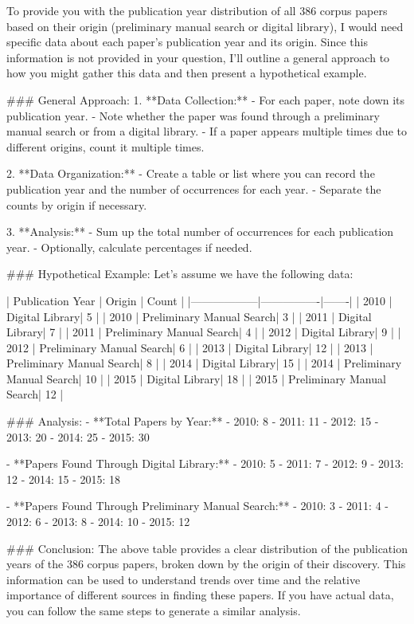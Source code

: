 To provide you with the publication year distribution of all 386 corpus papers based on their origin (preliminary manual search or digital library), I would need specific data about each paper's publication year and its origin. Since this information is not provided in your question, I'll outline a general approach to how you might gather this data and then present a hypothetical example.

### General Approach:
1. **Data Collection:**
   - For each paper, note down its publication year.
   - Note whether the paper was found through a preliminary manual search or from a digital library.
   - If a paper appears multiple times due to different origins, count it multiple times.

2. **Data Organization:**
   - Create a table or list where you can record the publication year and the number of occurrences for each year.
   - Separate the counts by origin if necessary.

3. **Analysis:**
   - Sum up the total number of occurrences for each publication year.
   - Optionally, calculate percentages if needed.

### Hypothetical Example:
Let's assume we have the following data:

| Publication Year | Origin         | Count |
|------------------|----------------|-------|
| 2010             | Digital Library| 5     |
| 2010             | Preliminary Manual Search| 3     |
| 2011             | Digital Library| 7     |
| 2011             | Preliminary Manual Search| 4     |
| 2012             | Digital Library| 9     |
| 2012             | Preliminary Manual Search| 6     |
| 2013             | Digital Library| 12    |
| 2013             | Preliminary Manual Search| 8     |
| 2014             | Digital Library| 15    |
| 2014             | Preliminary Manual Search| 10    |
| 2015             | Digital Library| 18    |
| 2015             | Preliminary Manual Search| 12    |

### Analysis:
- **Total Papers by Year:**
  - 2010: 8
  - 2011: 11
  - 2012: 15
  - 2013: 20
  - 2014: 25
  - 2015: 30

- **Papers Found Through Digital Library:**
  - 2010: 5
  - 2011: 7
  - 2012: 9
  - 2013: 12
  - 2014: 15
  - 2015: 18

- **Papers Found Through Preliminary Manual Search:**
  - 2010: 3
  - 2011: 4
  - 2012: 6
  - 2013: 8
  - 2014: 10
  - 2015: 12

### Conclusion:
The above table provides a clear distribution of the publication years of the 386 corpus papers, broken down by the origin of their discovery. This information can be used to understand trends over time and the relative importance of different sources in finding these papers. If you have actual data, you can follow the same steps to generate a similar analysis.